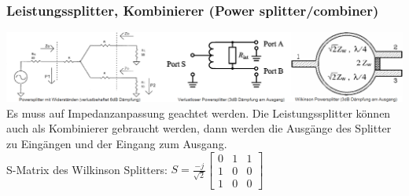 \subsubsection{Leistungssplitter, Kombinierer (Power splitter/combiner)
}
\includegraphics[width=19cm]{./bilder/rfdesign_powersplitter.png}\\
Es muss auf Impedanzanpassung geachtet werden. Die Leistungssplitter können
auch als Kombinierer gebraucht werden, dann werden die Ausgänge des Splitter zu
Eingängen und der Eingang zum Ausgang.\\
S-Matrix des Wilkinson Splitters: $S = \frac{-j}{\sqrt 2} \begin{bmatrix} 
         0 & 1 & 1 \\
         1 & 0 & 0 \\
         1 & 0 & 0          \end{bmatrix}$


